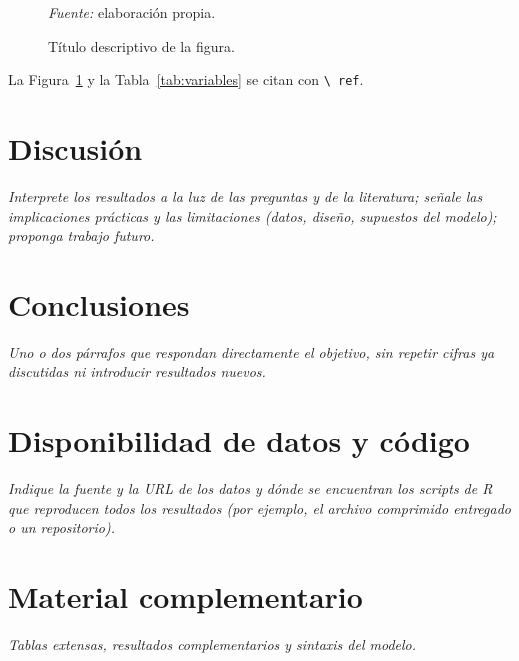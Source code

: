 \documentclass[11pt,letterpaper]{article}
\newcommand{\guia}[1]{{\color{gray}\itshape #1}}
\begin{document}
\begin{figure}[ht]
\centering
\caption{Título descriptivo de la figura.}
\label{fig:ejemplo}

\smallskip
\parbox{\textwidth}{\centering\footnotesize\textit{Fuente:} elaboración propia.}
\end{figure}

La Figura~\ref{fig:ejemplo} y la Tabla~\ref{tab:variables} se citan con \texttt{\textbackslash
ref}.

\section{Discusión}
\label{sec:discusion}

\guia{Interprete los resultados a la luz de las preguntas y de la literatura; señale las
implicaciones prácticas y las limitaciones (datos, diseño, supuestos del modelo); proponga
trabajo futuro.}

\section{Conclusiones}
\label{sec:conclusiones}

\guia{Uno o dos párrafos que respondan directamente el objetivo, sin repetir cifras ya
discutidas ni introducir resultados nuevos.}

\section*{Disponibilidad de datos y código}

\guia{Indique la fuente y la URL de los datos y dónde se encuentran los scripts de R que
reproducen todos los resultados (por ejemplo, el archivo comprimido entregado o un
repositorio).}

\nocite{deayala2022,rosseel2012,sarndal1992}




\appendix
\section{Material complementario}
\label{app:complementario}

\guia{Tablas extensas, resultados complementarios y sintaxis del modelo.}
\end{document}

